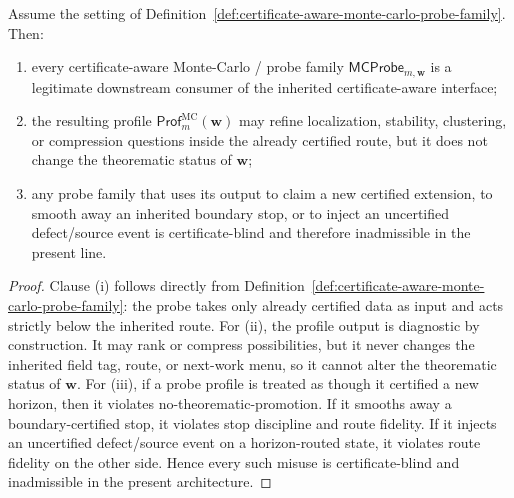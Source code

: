 \begin{proposition}
\label{prop:certificate-aware-monte-carlo-probes-have-diagnostic-force-but-no-theorematic-authority}
Assume the setting of Definition~\ref{def:certificate-aware-monte-carlo-probe-family}. Then:
\begin{enumerate}[label=(\roman*)]
  \item every certificate-aware Monte-Carlo / probe family \(\mathsf{MCProbe}_{m,\mathbf w}\) is a legitimate downstream consumer of the inherited certificate-aware interface;
  \item the resulting profile \(\mathsf{Prof}^{\mathrm{MC}}_{m}(\mathbf w)\) may refine localization, stability, clustering, or compression questions inside the already certified route, but it does not change the theorematic status of \(\mathbf w\);
  \item any probe family that uses its output to claim a new certified extension, to smooth away an inherited boundary stop, or to inject an uncertified defect/source event is certificate-blind and therefore inadmissible in the present line.
\end{enumerate}
\end{proposition}

\begin{proof}
Clause (i) follows directly from Definition~\ref{def:certificate-aware-monte-carlo-probe-family}: the probe takes only already certified data as input and acts strictly below the inherited route. For (ii), the profile output is diagnostic by construction. It may rank or compress possibilities, but it never changes the inherited field tag, route, or next-work menu, so it cannot alter the theorematic status of \(\mathbf w\). For (iii), if a probe profile is treated as though it certified a new horizon, then it violates no-theorematic-promotion. If it smooths away a boundary-certified stop, it violates stop discipline and route fidelity. If it injects an uncertified defect/source event on a horizon-routed state, it violates route fidelity on the other side. Hence every such misuse is certificate-blind and inadmissible in the present architecture.
\end{proof}

